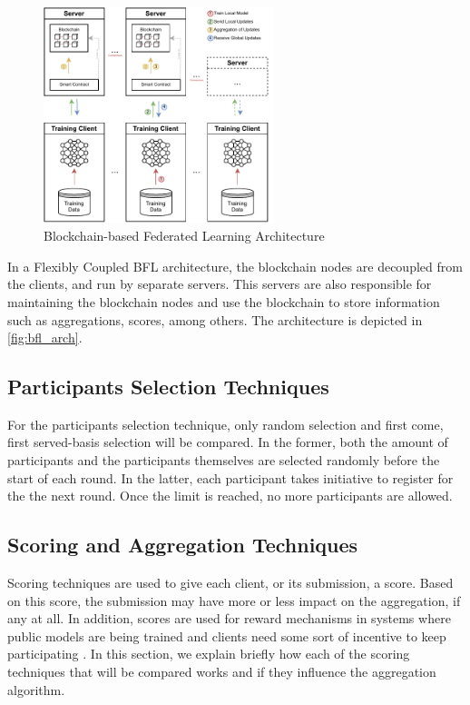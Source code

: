 \begin{figure}[!ht]
    \centering
    \centering
    \includegraphics[width=0.6\textwidth]{graphics/bfl-architecture.pdf}
    \caption{Blockchain-based Federated Learning Architecture}
    \label{fig:bfl_arch}
\end{figure}

In a Flexibly Coupled BFL architecture, the blockchain nodes are decoupled from the clients, and run by separate servers. This servers are also responsible for maintaining the blockchain nodes and use the blockchain to store information such as aggregations, scores, among others. The architecture is depicted in \autoref{fig:bfl_arch}.

\subsection{Participants Selection Techniques}

For the participants selection technique, only random selection and first come, first served-basis selection will be compared. In the former, both the amount of participants and the participants themselves are selected randomly before the start of each round. In the latter, each participant takes initiative to register for the the next round. Once the limit is reached, no more participants are allowed.

\subsection{Scoring and Aggregation Techniques}
\label{background:scoring}

Scoring techniques are used to give each client, or its submission, a score. Based on this score, the submission may have more or less impact on the aggregation, if any at all. In addition, scores are used for reward mechanisms in systems where public models are being trained and clients need some sort of incentive to keep participating \cite{8945913, 8832210, 8905038, 9006344}. In this section, we explain briefly how each of the scoring techniques that will be compared works and if they influence the aggregation algorithm.

